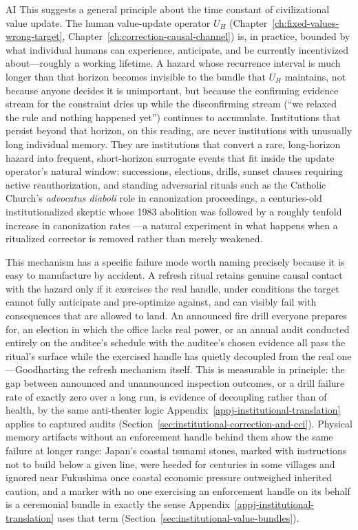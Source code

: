 \begin{refsection}
\begin{authbar}{AI}
This suggests a general principle about the time constant of civilizational value update. The human value-update operator \(U_H\) (Chapter~\ref{ch:fixed-values-wrong-target}, Chapter~\ref{ch:correction-causal-channel}) is, in practice, bounded by what individual humans can experience, anticipate, and be currently incentivized about---roughly a working lifetime. A hazard whose recurrence interval is much longer than that horizon becomes invisible to the bundle that \(U_H\) maintains, not because anyone decides it is unimportant, but because the confirming evidence stream for the constraint dries up while the disconfirming stream (``we relaxed the rule and nothing happened yet'') continues to accumulate. Institutions that persist beyond that horizon, on this reading, are never institutions with unusually long individual memory. They are institutions that convert a rare, long-horizon hazard into frequent, short-horizon surrogate events that fit inside the update operator's natural window: successions, elections, drills, sunset clauses requiring active reauthorization, and standing adversarial rituals such as the Catholic Church's \emph{advocatus diaboli} role in canonization proceedings, a centuries-old institutionalized skeptic whose 1983 abolition was followed by a roughly tenfold increase in canonization rates \autocite{woodward1996makingsaints}---a natural experiment in what happens when a ritualized corrector is removed rather than merely weakened.

This mechanism has a specific failure mode worth naming precisely because it is easy to manufacture by accident. A refresh ritual retains genuine causal contact with the hazard only if it exercises the real handle, under conditions the target cannot fully anticipate and pre-optimize against, and can visibly fail with consequences that are allowed to land. An announced fire drill everyone prepares for, an election in which the office lacks real power, or an annual audit conducted entirely on the auditee's schedule with the auditee's chosen evidence all pass the ritual's surface while the exercised handle has quietly decoupled from the real one---Goodharting the refresh mechanism itself. This is measurable in principle: the gap between announced and unannounced inspection outcomes, or a drill failure rate of exactly zero over a long run, is evidence of decoupling rather than of health, by the same anti-theater logic Appendix~\ref{appj-institutional-translation} applies to captured audits (Section~\ref{sec:institutional-correction-and-cci}). Physical memory artifacts without an enforcement handle behind them show the same failure at longer range: Japan's coastal tsunami stones, marked with instructions not to build below a given line, were heeded for centuries in some villages and ignored near Fukushima once coastal economic pressure outweighed inherited caution, and a marker with no one exercising an enforcement handle on its behalf is a ceremonial bundle in exactly the sense Appendix~\ref{appj-institutional-translation} uses that term (Section~\ref{sec:institutional-value-bundles}).


\end{authbar}
\end{refsection}
